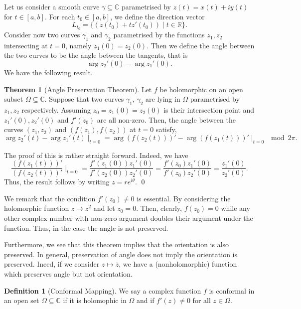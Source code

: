 \documentclass[
]{article}
\theoremstyle{definition}
\newtheorem{theorem}{Theorem}
\theoremstyle{definition}
\newtheorem{definition}{Definition}[section]
\begin{document}
Let us consider a smooth curve \(\gamma \subseteq \mathbb{C}\)
parametrised by \(z(t) = x(t) + iy(t)\) for \(t \in [a, b]\). For each
\(t_0 \in [a, b]\), we define the direction vector
\[L_{t_0} = \{(z(t_0) + tz'(t_0)) \mid t \in \mathbb{R}\}.\] Consider
now two curves \(\gamma_1\) and \(\gamma_2\) parametrised by the
functions \(z_1, z_2\) intersecting at \(t = 0\), namely
\(z_1(0) = z_2(0)\). Then we define the angle between the two curves to
be the angle between the tangents, that is
\[\arg z_2'(0) - \arg z_1'(0).\] We have the following result.

\begin{theorem}[Angle Preservation Theorem]
  Let \(f\) be holomorphic on an open subset \(\Omega \subseteq \mathbb{C}\). 
  Suppose that two curves \(\gamma_1\), \(\gamma_2\) are lying in \(\Omega\) 
  parametrised by \(z_1, z_2\) respectively. Assuming \(z_0 = z_1(0) = z_2(0)\) 
  is their intersection point and \(z_1'(0), z_2'(0)\) and \(f'(z_0)\) are all 
  non-zero. Then, the angle between the curves \((z_1, z_2)\) and \((f(z_1), f(z_2))\) 
  at \(t = 0\) satisfy, 
  \[\arg z_2'(t) - \arg z_1'(t) \mid_{t = 0} = 
    \arg (f(z_2(t)))' - \arg (f(z_1(t)))' \mid_{t = 0} \mod 2\pi.\]
\end{theorem}

\proof

The proof of this is rather straight forward. Indeed, we have
\[\frac{(f(z_1(t)))'}{(f(z_2(t)))'} \mid_{t = 0} = 
    \frac{f'(z_1(0))z_1'(0)}{f'(z_2(0))z_2'(0)} = 
    \frac{f'(z_0)z_1'(0)}{f'(z_0)z_2'(0)} = \frac{z_1'(0)}{z_2'(0)}.\]
Thus, the result follows by writing \(z = re^{i \theta}\). \qed

We remark that the condition \(f'(z_0) \neq 0\) is essential. By
considering the holomorphic function \(z \mapsto z^2\) and let
\(z_0 = 0\). Then, clearly, \(f(z_0) = 0\) while any other complex
number with non-zero argument doubles their argument under the function.
Thus, in the case the angle is not preserved.

Furthermore, we see that this theorem implies that the orientation is
also preserved. In general, preservation of angle does not imply the
orientation is preserved. Ineed, if we consider \(z \mapsto \bar z\), we
have a (nonholomorphic) function which preserves angle but not
orientation.

\begin{definition}[Conformal Mapping]
  We say a complex function \(f\) is conformal in an open set \(\Omega \subseteq \mathbb{C}\) 
  if it is holomophic in \(\Omega\) and if \(f'(z) \neq 0\) for all \(z \in \Omega\).
\end{definition}
\end{document}

